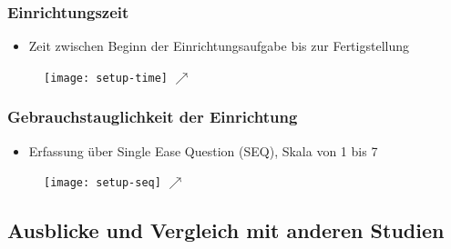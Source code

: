 \begin{frame}
    \frametitle{Einrichtungszeit}
    \begin{itemize}
        \item Zeit zwischen Beginn der Einrichtungsaufgabe bis zur Fertigstellung
    \end{itemize}
    \begin{figure}[c]
        \texttt{[image: setup-time]}
        \(\nearrow \)
    \end{figure}

\end{frame}

\begin{frame}
    \frametitle{Gebrauchstauglichkeit der Einrichtung}

    \begin{itemize}
        \item Erfassung über Single Ease Question (SEQ), Skala von 1 bis 7
    \end{itemize}

    \begin{figure}[c]
        \texttt{[image: setup-seq]}
        \(\nearrow \)
    \end{figure}

\end{frame}

\subsection{Ausblicke und Vergleich mit anderen Studien}
\begin{frame}
    \frametitle{\currentsectionname}

\end{frame}
